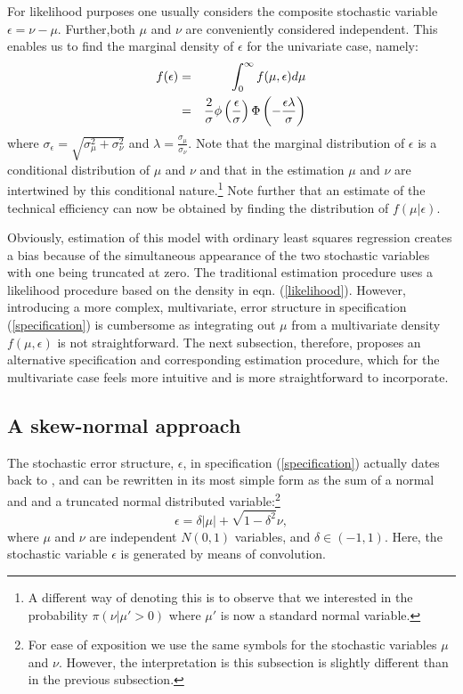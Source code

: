 \documentclass[11pt,parskip,abstracton,notitlepage]{scrartcl}
\begin{document}
For likelihood purposes one usually considers the composite stochastic variable $\epsilon = \nu-\mu$. Further,both $\mu$ and $\nu$ are conveniently considered independent. This enables us to find the marginal density of $\epsilon$ for the univariate case, namely:
%
\begin{eqnarray}
f(\epsilon)	&=& \int_0^\infty f(\mu, \epsilon)d\mu \notag\\
						&=& \frac{2}{\sigma}\phi\left(\frac{\epsilon}{\sigma}\right)\Phi\left(-\frac{\epsilon\lambda}{\sigma}\right)
\label{likelihood}
\end{eqnarray}
%
where $\sigma_\epsilon = \sqrt{\sigma_\mu^2 + \sigma_\nu^2}$ and $\lambda = \frac{\sigma_\mu}{\sigma_\nu}$. Note that the marginal distribution of $\epsilon$ is a conditional distribution of $\mu$ and $\nu$ and that in the estimation $\mu$ and $\nu$ are intertwined by this conditional nature.\footnote{A different way of denoting this is to observe that we interested in the probability $\pi(\nu|\mu'>0)$ where $\mu'$ is now a standard normal variable.} Note further that an estimate of the technical efficiency can now be obtained by finding the distribution of $f(\mu|\epsilon)$. 

Obviously, estimation of this model with ordinary least squares regression creates a bias because of the simultaneous appearance of the two stochastic variables with one being truncated at zero. The traditional estimation procedure uses a likelihood procedure based on the density in eqn. (\ref{likelihood}). However, introducing a more complex, multivariate, error structure in specification (\ref{specification}) is cumbersome as integrating out $\mu$ from a multivariate density $f(\mu, \epsilon)$ is not straightforward. The next subsection, therefore, proposes an alternative specification and corresponding estimation procedure, which for the multivariate case feels more intuitive and is more straightforward to incorporate.
%
\subsection{A skew-normal approach}\label{sub:unisn}
%
The stochastic error structure, $\epsilon$, in specification (\ref{specification}) actually dates back to \citet{WEINSTEIN1964}, and can be rewritten in its most simple form as the sum of a normal and and a truncated normal distributed variable:\footnote{For ease of exposition we use the same symbols for the stochastic variables $\mu$ and $\nu$. However, the interpretation is this subsection is slightly different than in the previous subsection.}
%
\begin{equation}
\epsilon = \delta|\mu| + \sqrt{1-\delta^2}\nu,
\label{convolution}
\end{equation}
%
where $\mu$ and $\nu$ are independent $N(0,1)$ variables, and $\delta \in (-1,1)$. Here, the stochastic variable $\epsilon $ is generated by means of convolution.
\end{document}
